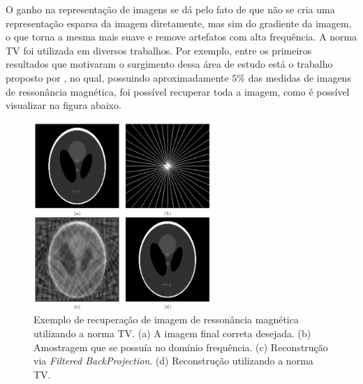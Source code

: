\documentclass[cic,tc]{iiufrgs}
\begin{document}
O ganho na representação de imagens se dá pelo fato de que não se cria uma representação esparsa da imagem
diretamente, mas sim do gradiente da imagem, o que torna a mesma mais suave e remove artefatos com alta
frequência.
A norma TV foi utilizada em diversos trabalhos.
Por exemplo, entre os primeiros resultados que motivaram o surgimento dessa área de estudo está
o trabalho proposto por \citet{CandesMRI}, no qual, possuindo aproximadamente $5\%$ das medidas de imagens de
ressonância magnética, foi possível recuperar toda a imagem, como é possível visualizar na figura 
abaixo.
\begin{figure}[H]
    \caption{Exemplo de recuperação de imagem de ressonância magnética utilizando a norma TV.
    (a) A imagem final correta desejada.
    (b) Amostragem que se possuía no domínio frequência.
    (c) Reconstrução via \textit{Filtered BackProjection}.
    (d) Reconstrução utilizando a norma TV.}
    \begin{center}
        \includegraphics[width=0.6\textwidth]{img/candesmri}
    \end{center}
    \label{fig:l1ball}
\end{figure}
\end{document}
